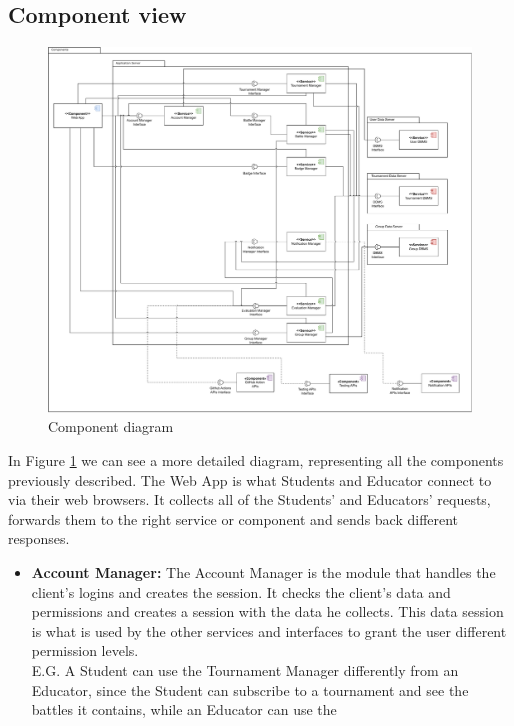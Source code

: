 \documentclass{article}
\begin{document}
{\subsection{Component view}
\begin{figure}[H]
    \centering
    \hspace*{-4.1cm}\includegraphics[scale=0.5]{images/ComponentView.pdf}
    \caption{Component diagram}
    \label{fig:componentView}
\end{figure}
In Figure \ref{fig:componentView} we can see a more detailed diagram, representing all the 
components previously described. The Web App is what Students and Educator connect to via their 
web browsers. It collects all of the Students' and Educators' requests, forwards them to the 
right service or component and sends back different responses.
\\
\begin{itemize}
\item \textbf{Account Manager:} The Account Manager is the module that handles the client's 
logins and creates the session. It checks the client's data and permissions and creates a session 
with the data he collects. This data session is what is used by the other services and
interfaces to grant the user different permission levels. \\
E.G. A Student can use the Tournament Manager differently from an Educator, since the Student 
can subscribe to a tournament and see the battles it contains, while an Educator can use the 

\end{itemize}}
\end{document}
